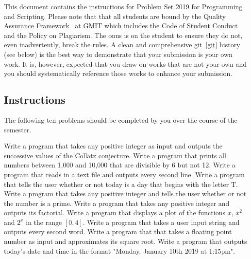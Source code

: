 \documentclass[a4paper, 12pt]{exam}
\title{\projectname}
\author{\modulename}
\date{Due: \duedate}
\newcommand{\modulename}{Programming and Scripting}
\newcommand{\projectyear}{2019}
\newcommand{\projectname}{Problem Set \projectyear}
\begin{document}
  
\maketitle

\noindent
This document contains the instructions for \projectname{} for \modulename{}.
Please note that that all students are bound by the Quality Assurance Framework~\cite{gmitqaf} at GMIT which includes the Code of Student Conduct and the Policy on Plagiarism.
The onus is on the student to ensure they do not, even inadvertently, break the rules.
A clean and comprehensive git~\ref{git} history (see below) is the best way to demonstrate that your submission is your own work.
It is, however, expected that you draw on works that are not your own and you should systematically reference those works to enhance your submission.


\subsection*{Instructions}
  The following ten problems should be completed by you over the course of the semester.

  
  \begin{questions}

    \question Write a program that takes any positive integer as input and outputs the successive values of the Collatz conjecture.
    \question Write a program that prints all numbers between 1,000 and 10,000 that are divisible by 6 but not 12.
    \question Write a program that reads in a text file and outputs every second line.
    \question Write a program that tells the user whether or not today is a day that begins with the letter T.
    \question Write a program that takes any positive integer and tells the user whether or not the number is a prime.
    \question Write a program that takes any positive integer and outputs its factorial.
    \question Write a program that displays a plot of the functions $x$, $x^2$ and $2^x$ in the range $[0, 4]$.
    \question Write a program that takes a user input string and outputs every second word.
    \question Write a program that that takes a floating point number as input and approximates its square root.
    \question Write a program that outputs today's date and time in the format "Monday, January 10th 2019 at 1:15pm".

\end{questions}
\end{document}
